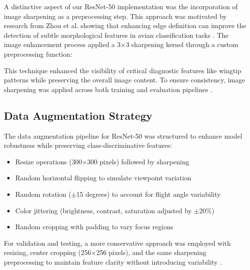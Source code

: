 \documentclass[a4paper,12pt]{article}
\begin{document}
A distinctive aspect of our ResNet-50 implementation was the incorporation of image sharpening as a preprocessing step. This approach was motivated by research from Zhou et al. showing that enhancing edge definition can improve the detection of subtle morphological features in avian classification tasks \citep{zhou2022effective}. The image enhancement process applied a 3$\times$3 sharpening kernel through a custom preprocessing function:


This technique enhanced the visibility of critical diagnostic features like wingtip patterns while preserving the overall image content. To ensure consistency, image sharpening was applied across both training and evaluation pipelines \citep{zhao2021image}.

\subsection{Data Augmentation Strategy}

The data augmentation pipeline for ResNet-50 was structured to enhance model robustness while preserving class-discriminative features:

\begin{itemize}
    \item Resize operations (300$\times$300 pixels) followed by sharpening
    \item Random horizontal flipping to simulate viewpoint variation
    \item Random rotation ($\pm$15 degrees) to account for flight angle variability
    \item Color jittering (brightness, contrast, saturation adjusted by $\pm$20\%)
    \item Random cropping with padding to vary focus regions
\end{itemize}

For validation and testing, a more conservative approach was employed with resizing, center cropping (256$\times$256 pixels), and the same sharpening preprocessing to maintain feature clarity without introducing variability \citep{shorten2019survey}.
\end{document}
